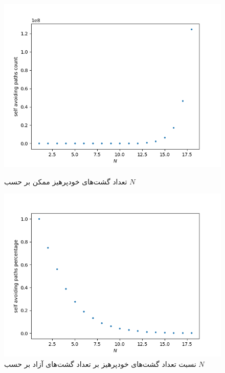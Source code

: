 \documentclass[11pt, a4paper]{article}
\begin{document}
\begin{figure}[h!]
	\centering
  \begin{minipage}[b]{0.48\textwidth}
    \includegraphics[width=\textwidth]{q7_self_avoiding_count_18.png}
    \caption{تعداد گشت‌های خود‌پرهیز ممکن بر حسب $N$}
    \label{fig:q7_count}
  \end{minipage}
  \hfill
  \begin{minipage}[b]{0.48\textwidth}
    \includegraphics[width=\textwidth]{q7_self_avoiding_percentage_18.png}
    \caption{نسبت تعداد گشت‌های خود‌پرهیز بر تعداد گشت‌های آزاد بر حسب $N$}
    \label{fig:q7_percentage}
  \end{minipage}
\end{figure}
\end{document}
